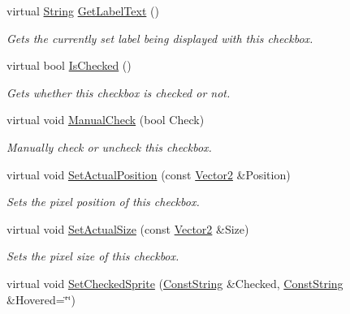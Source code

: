 \begin{DoxyCompactItemize}
virtual \hyperlink{namespaceMezzanine_acf9fcc130e6ebf08e3d8491aebcf1c86}{String} \hyperlink{classMezzanine_1_1UI_1_1CheckBox_a842ef69f568681a4e3b50d1b411467f6}{GetLabelText} ()
\begin{DoxyCompactList}\small\item\em Gets the currently set label being displayed with this checkbox. \item\end{DoxyCompactList}\item 
virtual bool \hyperlink{classMezzanine_1_1UI_1_1CheckBox_aafe54951cd6a51b6ad43abb5fd29696d}{IsChecked} ()
\begin{DoxyCompactList}\small\item\em Gets whether this checkbox is checked or not. \item\end{DoxyCompactList}\item 
virtual void \hyperlink{classMezzanine_1_1UI_1_1CheckBox_a83801877bb5b9de0f61895dabe4d0c62}{ManualCheck} (bool Check)
\begin{DoxyCompactList}\small\item\em Manually check or uncheck this checkbox. \item\end{DoxyCompactList}\item 
virtual void \hyperlink{classMezzanine_1_1UI_1_1CheckBox_afa566e7ad9bd33354a76e4ea964e85bf}{SetActualPosition} (const \hyperlink{classMezzanine_1_1Vector2}{Vector2} \&Position)
\begin{DoxyCompactList}\small\item\em Sets the pixel position of this checkbox. \item\end{DoxyCompactList}\item 
virtual void \hyperlink{classMezzanine_1_1UI_1_1CheckBox_a063a9c0ab24ddc4332711a7045e2786d}{SetActualSize} (const \hyperlink{classMezzanine_1_1Vector2}{Vector2} \&Size)
\begin{DoxyCompactList}\small\item\em Sets the pixel size of this checkbox. \item\end{DoxyCompactList}\item 
virtual void \hyperlink{classMezzanine_1_1UI_1_1CheckBox_a8f53b9129268f6d75d3f6539b11222df}{SetCheckedSprite} (\hyperlink{namespaceMezzanine_a63cd699ac54b73953f35ec9cfc05e506}{ConstString} \&Checked, \hyperlink{namespaceMezzanine_a63cd699ac54b73953f35ec9cfc05e506}{ConstString} \&Hovered=\char`\"{}\char`\"{})

\end{DoxyCompactItemize}
